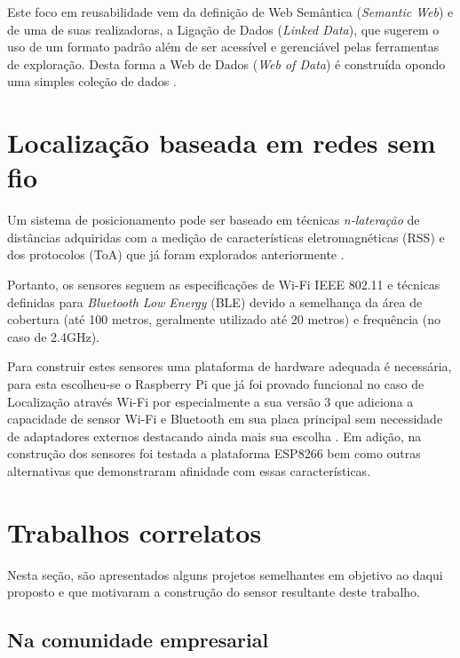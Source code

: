 Este foco em reusabilidade vem da definição de Web Semântica (\emph{Semantic
Web}) e de uma de suas realizadoras, a Ligação de Dados (\emph{Linked Data}),
que sugerem o uso de um formato padrão além de ser acessível e gerenciável pelas
ferramentas de exploração. Desta forma a Web de Dados (\emph{Web of Data}) é
construída opondo uma simples coleção de dados \cite{Bizer2009}.

\section{Localização baseada em redes sem fio}
\label{sec:Localização baseada em redes sem fio}

Um sistema de posicionamento pode ser baseado em técnicas
\emph{n-lateração} de distâncias adquiridas com a medição de características
eletromagnéticas (RSS) e dos protocolos (ToA) que já foram explorados anteriormente \cite{Abusubaih2007,
bahillo2009ieee, Feldmann2003}.

Portanto, os sensores seguem as especificações de Wi-Fi IEEE 802.11
\cite{Crow1997} e técnicas definidas para \emph{Bluetooth Low Energy} (BLE)
\cite{Hossain2007} devido a semelhança da área de cobertura (até 100 metros,
geralmente utilizado até 20 metros) e frequência (no caso de 2.4GHz).

Para construir estes sensores uma plataforma de hardware adequada é necessária,
para esta escolheu-se o Raspberry Pi \cite{Vujovic2014, Vujovic2015} que já
foi provado funcional no caso de Localização através Wi-Fi por
 especialmente a sua versão 3 que adiciona a capacidade
de sensor Wi-Fi e Bluetooth em sua placa principal sem
necessidade de adaptadores externos destacando ainda mais sua escolha
\cite{RPI2016}. Em adição, na construção dos sensores foi testada a plataforma ESP8266 bem como
outras alternativas que demonstraram afinidade com essas características.

\section{Trabalhos correlatos}
\label{Trabalhos correlatos}

Nesta seção, são apresentados alguns projetos semelhantes em objetivo ao daqui
proposto e que motivaram a construção do sensor resultante deste trabalho.

\subsection{Na comunidade empresarial}
\label{subsec:na comunidade empresarial}

